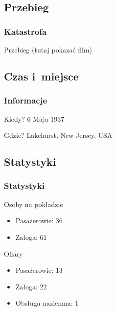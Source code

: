 \documentclass{beamer}
\begin{document}
\subsection{Przebieg}
\begin{frame}
	\frametitle{Katastrofa}
	\begin{block}{Przebieg}
	(tutaj pokazać film)
	\end{block}
\end{frame}
\subsection{Czas i~miejsce}
\begin{frame}
	\frametitle{Informacje}
	\begin{block}{Kiedy?}
	6 Maja 1937
	\end{block}
	\begin{block}{Gdzie?}
	Lakehurst, New Jersey, USA
	\end{block}
\end{frame}
\subsection{Statystyki}
\begin{frame}
	\frametitle{Statystyki}
	\begin{block}{Osoby na pokładzie}
		\begin{itemize}
			\item Pasażerowie: 36
			\item Załoga: 61
		\end{itemize}
	\end{block}
	\begin{block}{Ofiary}
		\begin{itemize}
			\item Pasażerowie: 13
			\item Załoga: 22
			\item Obsługa naziemna: 1
		\end{itemize}
	\end{block}
\end{frame}
\end{document}
